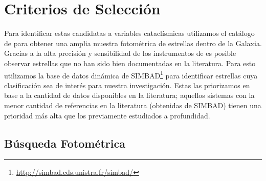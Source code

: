 \section{Criterios de Selección}

Para identificar estas candidatas a variables cataclísmicas utilizamos el
catálogo de \hyperref[muestra:sec:gaia]{\gaia} para obtener una amplia muestra
fotométrica de estrellas dentro de la Galaxia. Gracias a la alta precisión y
sensibilidad de los instrumentos de \gaia es posible observar estrellas que no
han sido bien documentadas en la literatura. Para esto utilizamos la base de
datos dinámica de SIMBAD\footnote{\url{http://simbad.cds.unistra.fr/simbad/}}
para identificar estrellas cuya clasificación sea de interés para nuestra
investigación. Estas las priorizamos en base a la cantidad de datos disponibles
en la literatura; aquellos sistemas con la menor cantidad de referencias en la
literatura (obtenidas de SIMBAD) tienen una prioridad más alta que los
previamente estudiados a profundidad.

\subsection{Búsqueda Fotométrica}

